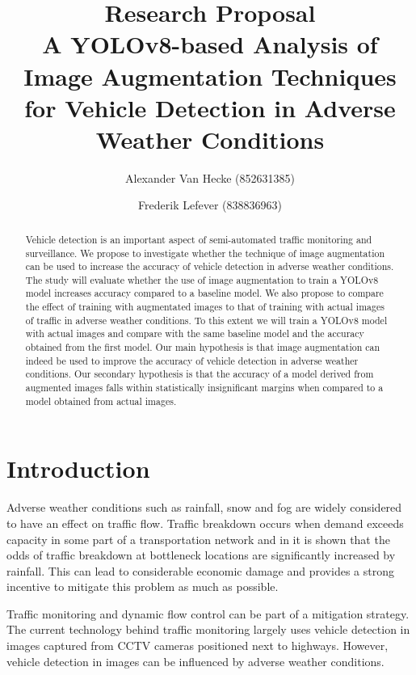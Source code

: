 \documentclass[]{article}
\title{Research Proposal \\
	A YOLOv8-based Analysis of Image Augmentation Techniques for Vehicle Detection in Adverse Weather Conditions}
\author{
		Alexander Van Hecke \small(852631385) \and 
		Frederik Lefever    \small(838836963)}
\begin{document}
\maketitle

\begin{abstract}
	Vehicle detection is an important aspect of semi-automated traffic monitoring and surveillance.  We propose to investigate whether the technique of image augmentation can be used to increase the accuracy of vehicle detection in adverse weather conditions.  The study will evaluate whether the use of image augmentation to train a YOLO\small{v8} model increases accuracy compared to a baseline model.  We also propose to compare the effect of training with augmentated images to that of training with actual images of traffic in adverse weather conditions. To this extent we will train a YOLO\small{v8} model with actual images and compare with the same baseline model and the accuracy obtained from the first model. Our main hypothesis is that image augmentation can indeed be used to improve the accuracy of vehicle detection in adverse weather conditions. Our secondary hypothesis is that the accuracy of a model derived from augmented images falls within statistically insignificant margins when compared to a model obtained from actual images.  
\end{abstract}

\section{Introduction}

	Adverse weather conditions such as rainfall, snow and fog are widely considered to have an effect on traffic flow. Traffic breakdown occurs when demand exceeds capacity in some part of a transportation network and in \cite{stralenInfluenceAdverseWeather2015} it is shown that the odds of traffic breakdown at bottleneck locations are significantly increased by rainfall.  This can lead to considerable economic damage and provides a strong incentive to mitigate this problem as much as possible.
	
	Traffic monitoring and dynamic flow control can be part of a mitigation strategy. The current technology behind traffic monitoring largely uses vehicle detection in images captured from CCTV cameras positioned next to highways. However, vehicle detection in images can be influenced by adverse weather conditions.
	
\end{document}
